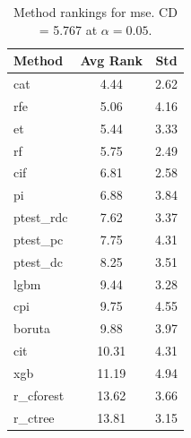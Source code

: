 \begin{table}[h]
\centering
\caption{Method rankings for mse. CD = 5.767 at $\alpha=0.05$.}
\label{tab:ranks_mse}
\begin{tabular}{lcc}
\toprule
Method & Avg Rank & Std \\
\midrule
cat & 4.44 & 2.62 \\
rfe & 5.06 & 4.16 \\
et & 5.44 & 3.33 \\
rf & 5.75 & 2.49 \\
cif & 6.81 & 2.58 \\
pi & 6.88 & 3.84 \\
ptest_rdc & 7.62 & 3.37 \\
ptest_pc & 7.75 & 4.31 \\
ptest_dc & 8.25 & 3.51 \\
lgbm & 9.44 & 3.28 \\
cpi & 9.75 & 4.55 \\
boruta & 9.88 & 3.97 \\
cit & 10.31 & 4.31 \\
xgb & 11.19 & 4.94 \\
r_cforest & 13.62 & 3.66 \\
r_ctree & 13.81 & 3.15 \\
\bottomrule
\end{tabular}
\end{table}
